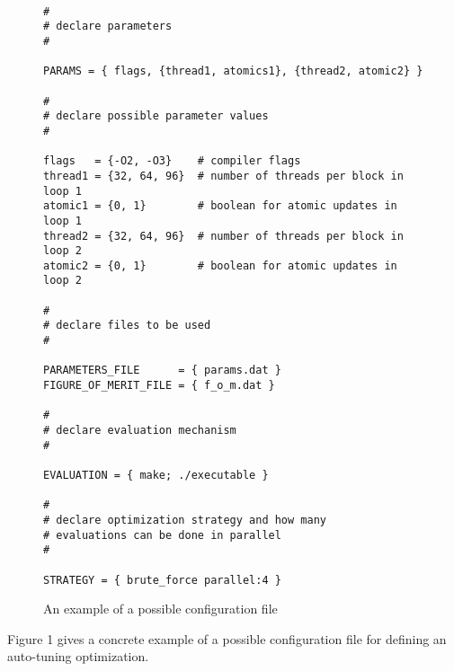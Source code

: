 \documentclass[12pt]{article}
\begin{document}
\begin{figure}
\begin{verbatim}

#
# declare parameters
#

PARAMS = { flags, {thread1, atomics1}, {thread2, atomic2} }

#
# declare possible parameter values
#

flags   = {-O2, -O3}    # compiler flags
thread1 = {32, 64, 96}  # number of threads per block in loop 1
atomic1 = {0, 1}        # boolean for atomic updates in loop 1
thread2 = {32, 64, 96}  # number of threads per block in loop 2
atomic2 = {0, 1}        # boolean for atomic updates in loop 2

#
# declare files to be used
#

PARAMETERS_FILE      = { params.dat }
FIGURE_OF_MERIT_FILE = { f_o_m.dat }

#
# declare evaluation mechanism
#

EVALUATION = { make; ./executable }

#
# declare optimization strategy and how many
# evaluations can be done in parallel
#

STRATEGY = { brute_force parallel:4 }

\end{verbatim}

\caption{An example of a possible configuration file}
\end{figure}

Figure 1 gives a concrete example of a possible configuration file
for defining an auto-tuning optimization.
\end{document}
